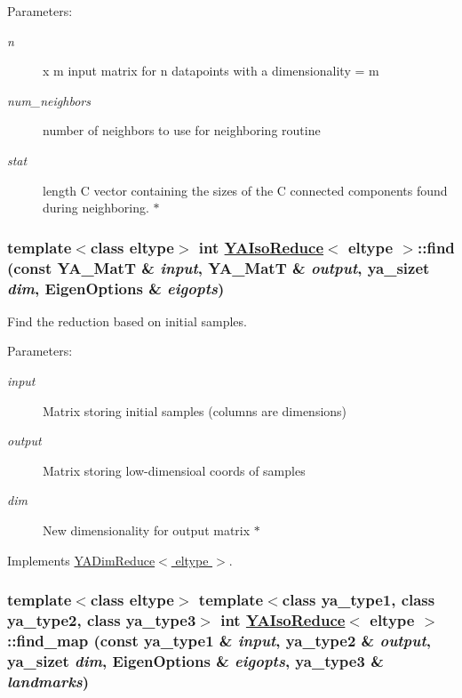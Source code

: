 \begin{Desc}
\item[Parameters:]
\begin{description}
\item[{\em n}]x m input matrix for n datapoints with a dimensionality = m \item[{\em num\_\-neighbors}]number of neighbors to use for neighboring routine \item[{\em stat}]length C vector containing the sizes of the C connected components found during neighboring. $\ast$ \end{description}
\end{Desc}
\hypertarget{class_y_a_iso_reduce_a9}{
\subsubsection[find]{\setlength{\rightskip}{0pt plus 5cm}template$<$class eltype$>$ int \hyperlink{class_y_a_iso_reduce}{YAIso\-Reduce}$<$ eltype $>$::find (const YA\_\-Mat\-T \& {\em input}, YA\_\-Mat\-T \& {\em output}, ya\_\-sizet {\em dim}, Eigen\-Options \& {\em eigopts})}}
\label{class_y_a_iso_reduce_a9}


Find the reduction based on initial samples. 

\begin{Desc}
\item[Parameters:]
\begin{description}
\item[{\em input}]Matrix storing initial samples (columns are dimensions) \item[{\em output}]Matrix storing low-dimensioal coords of samples \item[{\em dim}]New dimensionality for output matrix $\ast$ \end{description}
\end{Desc}


Implements \hyperlink{class_y_a_dim_reduce_a8}{YADim\-Reduce$<$ eltype $>$}.\hypertarget{class_y_a_iso_reduce_a6}{
\subsubsection[find\_\-map]{\setlength{\rightskip}{0pt plus 5cm}template$<$class eltype$>$ template$<$class ya\_\-type1, class ya\_\-type2, class ya\_\-type3$>$ int \hyperlink{class_y_a_iso_reduce}{YAIso\-Reduce}$<$ eltype $>$::find\_\-map (const ya\_\-type1 \& {\em input}, ya\_\-type2 \& {\em output}, ya\_\-sizet {\em dim}, Eigen\-Options \& {\em eigopts}, ya\_\-type3 \& {\em landmarks})}}
\label{class_y_a_iso_reduce_a6}


